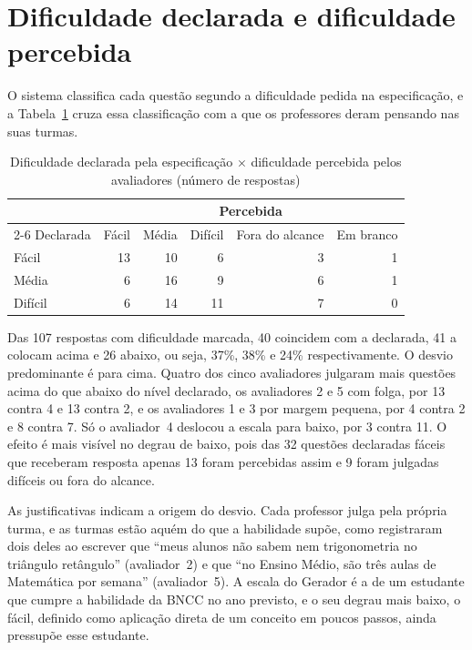 \section{Dificuldade declarada e dificuldade percebida}
\label{sub:rodada1-dificuldade}

O sistema classifica cada questão segundo a dificuldade pedida na especificação, e a
Tabela~\ref{tab:rodada1-dificuldade} cruza essa classificação com a que os professores deram
pensando nas suas turmas.

\begin{table}[htbp]
  \centering
  \caption{Dificuldade declarada pela especificação $\times$ dificuldade percebida pelos
  avaliadores (número de respostas)}
  \label{tab:rodada1-dificuldade}
  \begin{tabular}{lrrrrr}
    \toprule
    & \multicolumn{5}{c}{Percebida} \\
    \cmidrule(l){2-6}
    Declarada & Fácil & Média & Difícil & Fora do alcance & Em branco \\
    \midrule
    Fácil & 13 & 10 & 6 & 3 & 1 \\
    Média & 6 & 16 & 9 & 6 & 1 \\
    Difícil & 6 & 14 & 11 & 7 & 0 \\
    \bottomrule
  \end{tabular}
\end{table}

Das 107 respostas com dificuldade marcada, 40 coincidem com a declarada, 41 a colocam acima e 26
abaixo, ou seja, 37\%, 38\% e 24\% respectivamente. O desvio predominante é para cima. Quatro dos
cinco avaliadores julgaram mais questões acima do que abaixo do nível declarado, os avaliadores 2 e
5 com folga, por 13 contra 4 e 13 contra 2, e os avaliadores 1 e 3 por margem pequena, por 4 contra
2 e 8 contra 7. Só o avaliador~4 deslocou a escala para baixo, por 3 contra 11. O efeito é mais
visível no degrau de baixo, pois das 32 questões declaradas fáceis que receberam resposta apenas 13
foram percebidas assim e 9 foram julgadas difíceis ou fora do alcance.

As justificativas indicam a origem do desvio. Cada professor julga pela própria turma, e as turmas
estão aquém do que a habilidade supõe, como registraram dois deles ao escrever que ``meus alunos não
sabem nem trigonometria no triângulo retângulo'' (avaliador~2) e que ``no Ensino Médio, são três
aulas de Matemática por semana'' (avaliador~5). A escala do Gerador é a de um estudante que cumpre a
habilidade da BNCC no ano previsto, e o seu degrau mais baixo, o fácil, definido como aplicação
direta de um conceito em poucos passos, ainda pressupõe esse estudante.

